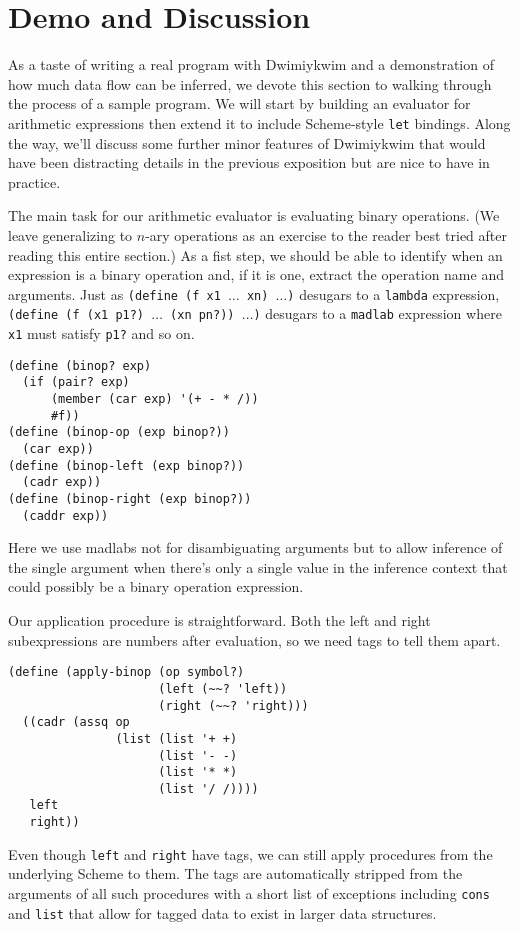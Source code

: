 \documentclass[11pt]{article}
\begin{document}
\section{Demo and Discussion}

As a taste of writing a real program with Dwimiykwim
and a demonstration of how much data flow can be inferred,
we devote this section to walking through the process of a sample program.
We will start by building an evaluator for arithmetic expressions
then extend it to include Scheme-style \texttt{let} bindings.
Along the way, we'll discuss some further minor features of Dwimiykwim
that would have been distracting details in the previous exposition
but are nice to have in practice.

The main task for our arithmetic evaluator is evaluating binary operations.
(We leave generalizing to $n$-ary operations as an exercise to the reader
best tried after reading this entire section.)
As a fist step, we should be able to identify
when an expression is a binary operation
and, if it is one, extract the operation name and arguments.
Just as \texttt{(define (f x1 $\dots$ xn) $\dots$)}
desugars to a \texttt{lambda} expression,
\texttt{(define (f (x1 p1?) $\dots$ (xn pn?)) $\dots$)}
desugars to a \texttt{madlab} expression
where \texttt{x1} must satisfy \texttt{p1?} and so on.
\begin{Verbatim}
(define (binop? exp)
  (if (pair? exp)
      (member (car exp) '(+ - * /))
      #f))
(define (binop-op (exp binop?))
  (car exp))
(define (binop-left (exp binop?))
  (cadr exp))
(define (binop-right (exp binop?))
  (caddr exp))
\end{Verbatim}
Here we use madlabs not for disambiguating arguments
but to allow inference of the single argument
when there's only a single value in the inference context
that could possibly be a binary operation expression.

Our application procedure is straightforward.
Both the left and right subexpressions are numbers after evaluation,
so we need tags to tell them apart.
\begin{Verbatim}
(define (apply-binop (op symbol?)
                     (left (~~? 'left))
                     (right (~~? 'right)))
  ((cadr (assq op
               (list (list '+ +)
                     (list '- -)
                     (list '* *)
                     (list '/ /))))
   left
   right))
\end{Verbatim}
Even though \texttt{left} and \texttt{right} have tags,
we can still apply procedures from the underlying Scheme to them.
The tags are automatically stripped from the arguments of all such procedures
with a short list of exceptions including \texttt{cons} and \texttt{list}
that allow for tagged data to exist in larger data structures.
\end{document}
